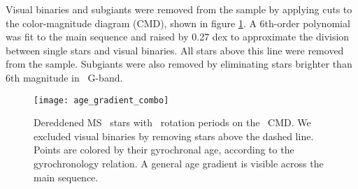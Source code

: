 Visual binaries and subgiants were removed from the sample by applying cuts to
the color-magnitude diagram (CMD), shown in figure \ref{fig:age_gradient}.
A 6th-order polynomial was fit to the main sequence and raised by 0.27 dex to
approximate the division between single stars and visual binaries.
All stars above this line were removed from the sample.
Subgiants were also removed by eliminating stars brighter than 6th magnitude
in \gaia\ G-band.
\begin{figure}
  \caption{
Dereddened MS \kepler\ stars with \mct\ rotation periods on the \gaia\ CMD.
We excluded visual binaries by removing stars above the dashed line.
    Points are colored by their gyrochronal
    age, according to the
    \citet{angus2019} gyrochronology relation.
    A general age gradient is visible across the main sequence.
}
  \centering
    \texttt{[image: age\_gradient\_combo]}
\label{fig:age_gradient}
\end{figure}

